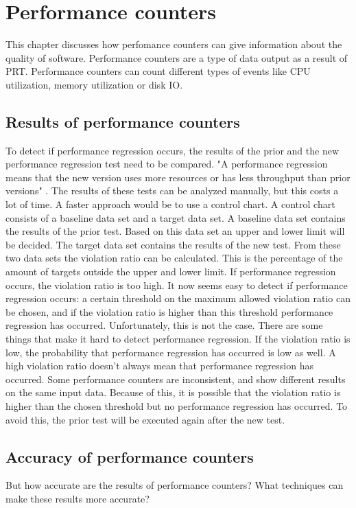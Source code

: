\section{Performance counters}

This chapter discusses how perfomance counters can give information about the quality of software. Performance counters are a type of data output as a result of PRT. Performance counters can count different types of events like CPU utilization, memory utilization or disk IO.

\subsection{Results of performance counters}
To detect if performance regression occurs, the results of the prior and the new performance regression test need to be compared. "A performance regression means that the new version uses more resources or has less throughput than prior versions" \cite{DetectionPerformanceRegression}. The results of these tests can be analyzed manually, but this costs a lot of time. A faster approach would be to use a control chart. A control chart consists of a baseline data set and a target data set. A baseline data set contains the results of the prior test. Based on this data set an upper and lower limit will be decided. The target data set contains the results of the new test. From these two data sets the violation ratio can be calculated. This is the percentage of the amount of targets outside the upper and lower limit. If performance regression occurs, the violation ratio is too high. It now seems easy to detect if performance regression occurs: a certain threshold on the maximum allowed violation ratio can be chosen, and if the violation ratio is higher than this threshold performance regression has occurred. Unfortunately, this is not the case. There are some things that make it hard to detect performance regression. If the violation ratio is low, the probability that performance regression has occurred is low as well. A high violation ratio doesn't always mean that performance regression has occurred. Some performance counters are inconsistent, and show different results on the same input data. Because of this, it is possible that the violation ratio is higher than the chosen threshold but no performance regression has occurred. To avoid this, the prior test will be executed again after the new test.

\subsection{Accuracy of performance counters}
But how accurate are the results of performance counters? What techniques can make these results more accurate?

